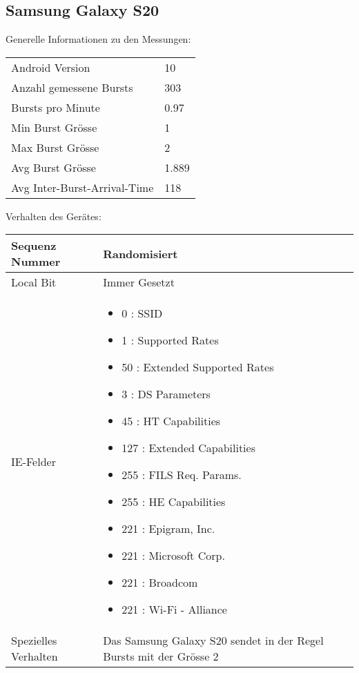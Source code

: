 \subsection*{Samsung Galaxy S20}
Generelle Informationen zu den Messungen:

\begin{table}[h!]
    \begin{tabularx}{\textwidth}{l X }
        \toprule
        Android Version & 10 \\
        Anzahl gemessene Bursts & 303 \\
        Bursts pro Minute & 0.97 \\
        Min Burst Grösse & 1 \\
        Max Burst Grösse & 2 \\
        Avg Burst Grösse & 1.889 \\
        Avg Inter-Burst-Arrival-Time & 118 \\
        \bottomrule
    \end{tabularx}
\end{table}

Verhalten des Gerätes:

\begin{table}[h!]
    \begin{tabularx}{\textwidth}{l X }
        \toprule
        Sequenz Nummer & Randomisiert \\
        \midrule
        Local Bit & Immer Gesetzt \\
        \midrule
        IE-Felder & \begin{itemize}
            \item 0 : SSID
            \item 1 : Supported Rates
            \item 50 : Extended Supported Rates
            \item 3 : DS Parameters
            \item 45 : HT Capabilities
            \item 127 : Extended Capabilities
            \item 255 : FILS Req. Params.
            \item 255 : HE Capabilities
            \item 221 : Epigram, Inc.
            \item 221 : Microsoft Corp.
            \item 221 : Broadcom
            \item 221 : Wi-Fi - Alliance
        \end{itemize} \\
        \midrule
        Spezielles Verhalten & Das Samsung Galaxy S20 sendet in der Regel Bursts mit der Grösse 2 \\
        \bottomrule
    \end{tabularx}
\end{table}
\clearpage


